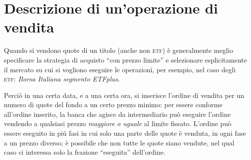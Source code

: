 \documentclass[12pt,a4paper]{article}
\newcommand{\Undefine}[1]{\let#1\CustomUndefined}
\newcommand{\Define}[2]{%
\Undefine{#1}
\newcommand{#1}{#2}
}
\newcommand{\Parentesi}[1]{(#1)}
\newcommand{\Virgolette}[1]{``#1''}
\newcommand{\Etf}[1]{\textsc{etf}}
\newcommand{\RedditoDiverso}{\emph{reddito diverso}}
\newcommand{\RendimentoPercentuale}{\emph{rendimento percentuale}}
\begin{document}
\section{Descrizione di un'operazione di vendita}


\Define{\UnoNumeroQuote}{20}
\Define{\DueNumeroQuote}{30}
\Define{\TreNumeroQuote}{50}
\Define{\UnoPrezzoEseguito}{52,00}
\Define{\DuePrezzoEseguito}{53,00}
\Define{\TrePrezzoEseguito}{55,00}

\Define{\NumeroQuote}{100}
\Define{\PrezzoMedioEffettivo}{53,80}
\Define{\ControvaloreOperazione}{5380,00}

\Define{\PrezzoMedioEffettivoNelSaldoPrecedente}{50,00}
\Define{\PrezzoMedioCaricoNelSaldoPrecedente}{50,15}
\Define{\RedditoDaCapitale}{380,00}
\Define{\TassaSulRedditoDaCapitale}{98,80}

\Define{\CostoOperazione}{15,91}
\Define{\CostoMedioPerQuotaNelSaldoPrecedente}{0,15}
\Define{\CostoAcquistoQuoteVendute}{15,00}
\Define{\RedditoDiverso}{-30,91}

\Define{\ControvaloreTotale}{5265,29}
\Define{\PrezzoMedioNetto}{52,6529}
\Define{\RendimentoPercentuale}{+4,9908}
\Define{\RendimentoInValuta}{250,29}


Quando si vendono quote di un titolo  \Parentesi{anche non \Etf{}} è generalmente meglio specificare
la strategia di  acquisto \Virgolette{con prezzo limite} e selezionare  esplicitamente il mercato su
cui si  vogliono eseguire le  operazioni, per esempio, nel  caso degli \Etf{}:  \emph{Borsa Italiana
   segmento ETFplus}.

Perciò in una certa data, e a una certa ora, si inserisce l'ordine di vendita per un numero di quote
del fondo a un certo prezzo minimo: per  essere conforme all'ordine inserito, la banca che agisce da
intermediario può eseguire  l'ordine vendendo a qualsiasi prezzo \emph{maggiore  o uguale} al limite
fissato.  L'ordine può essere eseguito  in piú fasi in cui solo una parte  delle quote è venduta, in
ogni fase a  un prezzo diverso; è possibile che  non tutte le quote siano vendute,  nel qual caso ci
interessa solo la frazione \Virgolette{eseguita} dell'ordine.
\end{document}
